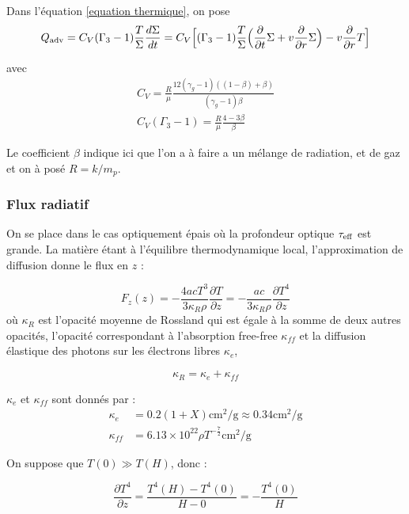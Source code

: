 \documentclass[a4paper,12pt]{article}
\newcommand{\derivt}[1]{\frac{\partial}{\partial t} #1}
\newcommand{\derivr}[1]{\frac{\partial}{\partial r} #1}
\begin{document}
Dans l'équation \eqref{equation thermique}, on pose 
\begin{equation*}
    Q_{\rm{adv}}=C_V(\Gamma_3-1)\frac{T}{\Sigma}\frac{d\Sigma}{dt}=C_V\Big[ (\Gamma_3 - 1) \frac{T}{\Sigma}\Big( \derivt{\Sigma}+v\derivr{\Sigma} \Big) -v\derivr{T} \Big]
\end{equation*}

avec 
\begin{gather}
    C_V = \frac{R}{\mu}\frac{12(\gamma_g -1)((1-\beta)+\beta)}{(\gamma_g - 1)\beta}\\
    C_V(\Gamma_3 -1) = \frac{R}{\mu}\frac{4-3\beta}{\beta}
\end{gather}

Le coefficient $\beta$ indique ici que l'on a à faire a un mélange de radiation, et de gaz et on à posé $R=k/m_p$.

\subsubsection{Flux radiatif}
On se place dans le cas optiquement épais où la profondeur optique $\tau_{\rm{eff}}$ est grande. La matière étant à l'équilibre thermodynamique local, l'approximation de diffusion donne le flux en $z$ :

\begin{equation*}
    F_z(z)=-\frac{4acT^3}{3\kappa_{R}\rho}\frac{\partial T}{\partial z}=-\frac{ac}{3\kappa_R \rho}\frac{\partial T^4}{\partial z}
\end{equation*}
où $\kappa_{R}$ est l'opacité moyenne de Rossland qui est égale à la somme de deux autres opacités, l'opacité correspondant à l'absorption free-free $\kappa_{ff}$ et la diffusion élastique des photons sur les électrons libres $\kappa_e$,

$$\kappa_R=\kappa_e+\kappa_{ff}$$

$\kappa_e$ et $\kappa_{ff}$ sont donnés par :
\begin{equation}
    \begin{split}
        \kappa_e &= 0.2(1+X) \text{cm$^2$/g} \approx 0.34 \text{cm$^2$/g}\\
        \kappa_{ff} &= 6.13 \times 10^{22}\rho T^{-\frac{7}{2}} \text{cm$^2$/g}
    \end{split}
\end{equation}

On suppose que $T(0) \gg T(H)$, donc :

\begin{equation*}
    \frac{\partial T^4}{\partial z}=\frac{T^4(H)-T^4(0)}{H-0}=-\frac{T^4(0)}{H}
\end{equation*}
\end{document}
